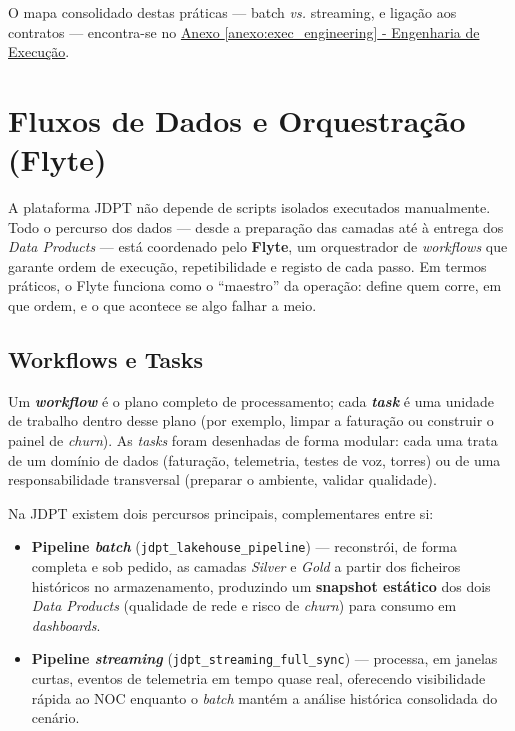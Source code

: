 \documentclass[runningheads]{llncs}
\begin{document}
O mapa consolidado destas práticas --- batch \textit{vs.} streaming, e ligação aos contratos --- encontra-se no \hyperref[anexo:exec_engineering]{Anexo \ref*{anexo:exec_engineering} - Engenharia de Execução}.


\section{Fluxos de Dados e Orquestração (Flyte)}

A plataforma JDPT não depende de scripts isolados executados manualmente. Todo o percurso dos dados --- desde a preparação das camadas até à entrega dos \textit{Data Products} --- está coordenado pelo \textbf{Flyte}, um orquestrador de \textit{workflows} que garante ordem de execução, repetibilidade e registo de cada passo. Em termos práticos, o Flyte funciona como o ``maestro'' da operação: define quem corre, em que ordem, e o que acontece se algo falhar a meio.


\subsection{Workflows e Tasks}

Um \textbf{\textit{workflow}} é o plano completo de processamento; cada \textbf{\textit{task}} é uma unidade de trabalho dentro desse plano (por exemplo, limpar a faturação ou construir o painel de \textit{churn}). As \textit{tasks} foram desenhadas de forma modular: cada uma trata de um domínio de dados (faturação, telemetria, testes de voz, torres) ou de uma responsabilidade transversal (preparar o ambiente, validar qualidade).

Na JDPT existem dois percursos principais, complementares entre si:

\begin{itemize}
    \item \textbf{Pipeline \textit{batch}} (\texttt{jdpt\_lakehouse\_pipeline}) --- reconstrói, de forma completa e sob pedido, as camadas \textit{Silver} e \textit{Gold} a partir dos ficheiros históricos no armazenamento, produzindo um \textbf{snapshot estático} dos dois \textit{Data Products} (qualidade de rede e risco de \textit{churn}) para consumo em \textit{dashboards}.
    \item \textbf{Pipeline \textit{streaming}} (\texttt{jdpt\_streaming\_full\_sync}) --- processa, em janelas curtas, eventos de telemetria em tempo quase real, oferecendo visibilidade rápida ao NOC enquanto o \textit{batch} mantém a análise histórica consolidada do cenário.
\end{itemize}
\end{document}
